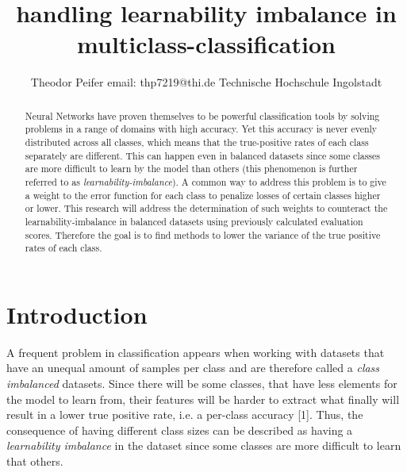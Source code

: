 \documentclass[journal]{IEEEtran}
\begin{document}
 
\title{\textbf{handling learnability imbalance in multiclass-classification}}



\author{Theodor Peifer
        \linebreak
        email: thp7219@thi.de
        \linebreak
        Technische Hochschule Ingolstadt
}



\maketitle


\begin{abstract}
Neural Networks have proven themselves to be powerful classification
tools by solving problems in a range of domains with high accuracy.
Yet this accuracy is never evenly distributed across all classes, which means that the true-positive rates of each class separately are different.
This can happen even in balanced datasets since some classes are more difficult to learn by the model than others (this phenomenon is further referred to as \emph{learnability-imbalance}).
A common way to address this problem is to give a weight to the error function for each class to penalize losses of certain classes higher or lower.
This research will address the determination of such weights to counteract the learnability-imbalance in balanced datasets using previously calculated evaluation scores.
Therefore the goal is to find methods to lower the variance of the true positive rates of each class.
\end{abstract}


\section{Introduction}
A frequent problem in classification appears when working with datasets that have an unequal amount of samples per class and are therefore called a \emph{class imbalanced} datasets. %
Since there will be some classes, that have less elements for the model to learn from, their features will be harder to extract what finally will result in a lower true positive rate, i.e. a per-class accuracy [1].
Thus, the consequence of having different class sizes can be described as having a \emph{learnability imbalance} in the dataset since some classes are more difficult to learn that others.
\end{document}
